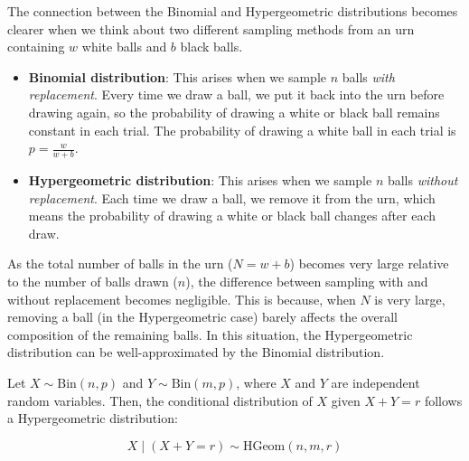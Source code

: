 The connection between the Binomial and Hypergeometric distributions becomes clearer when we think about two different sampling methods from an urn containing \( w \) white balls and \( b \) black balls.

\begin{itemize}
    \item \textbf{Binomial distribution}: This arises when we sample \( n \) balls \textit{with replacement}. Every time we draw a ball, we put it back into the urn before drawing again, so the probability of drawing a white or black ball remains constant in each trial. The probability of drawing a white ball in each trial is \( p = \frac{w}{w + b} \).
    
    \item \textbf{Hypergeometric distribution}: This arises when we sample \( n \) balls \textit{without replacement}. Each time we draw a ball, we remove it from the urn, which means the probability of drawing a white or black ball changes after each draw.
\end{itemize}

As the total number of balls in the urn (\( N = w + b \)) becomes very large relative to the number of balls drawn (\( n \)), the difference between sampling with and without replacement becomes negligible. This is because, when \( N \) is very large, removing a ball (in the Hypergeometric case) barely affects the overall composition of the remaining balls. In this situation, the Hypergeometric distribution can be well-approximated by the Binomial distribution.


\begin{theorem}
    Let \( X \sim \text{Bin}(n, p) \) and \( Y \sim \text{Bin}(m, p) \), where \( X \) and \( Y \) are independent random variables. Then, the conditional distribution of \( X \) given \( X + Y = r \) follows a Hypergeometric distribution:

    \[
    X \mid (X + Y = r) \sim \text{HGeom}(n, m, r)
    \]    
\end{theorem}

